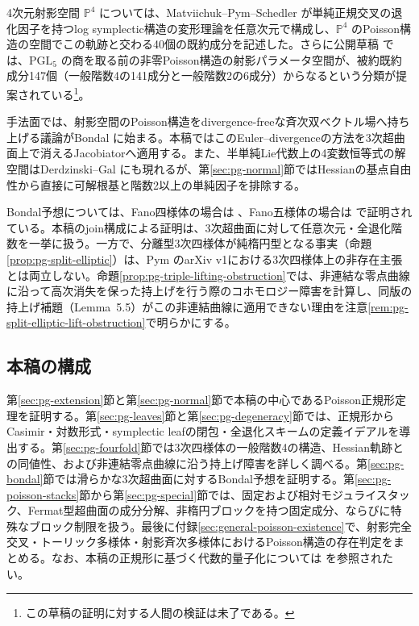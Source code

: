 4次元射影空間 $\mathbb P^4$ については、Matviichuk--Pym--Schedler \cite[Theorems~1.2--1.4]{MPSLocalTorelli} が単純正規交叉の退化因子を持つlog symplectic構造の変形理論を任意次元で構成し、$\mathbb P^4$ のPoisson構造の空間でこの軌跡と交わる40個の既約成分を記述した。さらに公開草稿 \cite{PoissonP4Draft} では、$\mathrm{PGL}_5$ の商を取る前の非零Poisson構造の射影パラメータ空間が、被約既約成分147個（一般階数4の141成分と一般階数2の6成分）からなるという分類が提案されている\footnote{この草稿の証明に対する人間の検証は未了である。}。

手法面では、射影空間のPoisson構造をdivergence-freeな斉次双ベクトル場へ持ち上げる議論がBondal \cite[\S4]{PBondal93} に始まる。本稿ではこのEuler--divergenceの方法を3次超曲面上で消えるJacobiatorへ適用する。また、半単純Lie代数上の4変数恒等式の解空間はDerdzinski--Gal \cite[(1.4), Theorem~B]{PDerdzinskiGal} にも現れるが、第\ref{sec:pg-normal}節ではHessianの基点自由性から直接に可解根基と階数2以上の単純因子を排除する。

Bondal予想については、Fano四様体の場合は \cite[Theorem~7.13]{BondalGualtieriPym}、Fano五様体の場合は \cite[Corollary~1.3]{BondalDruelPereiraPymTouzet} で証明されている。本稿のjoin構成による証明は、3次超曲面に対して任意次元・全退化階数を一挙に扱う。一方で、分離型3次四様体が純楕円型となる事実（命題\ref{prop:pg-split-elliptic}）は、Pym \cite[Theorem~1.3]{PPymElliptic} のarXiv v1における3次四様体上の非存在主張とは両立しない。命題\ref{prop:pg-triple-lifting-obstruction}では、非連結な零点曲線に沿って高次消失を保った持上げを行う際のコホモロジー障害を計算し、同版の持上げ補題（Lemma~5.5）がこの非連結曲線に適用できない理由を注意\ref{rem:pg-split-elliptic-lift-obstruction}で明らかにする。

\subsection*{本稿の構成}
第\ref{sec:pg-extension}節と第\ref{sec:pg-normal}節で本稿の中心であるPoisson正規形定理を証明する。第\ref{sec:pg-leaves}節と第\ref{sec:pg-degeneracy}節では、正規形からCasimir・対数形式・symplectic leafの閉包・全退化スキームの定義イデアルを導出する。第\ref{sec:pg-fourfold}節では3次四様体の一般階数4の構造、Hessian軌跡との同値性、および非連結零点曲線に沿う持上げ障害を詳しく調べる。第\ref{sec:pg-bondal}節では滑らかな3次超曲面に対するBondal予想を証明する。第\ref{sec:pg-poisson-stacks}節から第\ref{sec:pg-special}節では、固定および相対モジュライスタック、Fermat型超曲面の成分分解、非楕円ブロックを持つ固定成分、ならびに特殊なブロック制限を扱う。最後に付録\ref{sec:general-poisson-existence}で、射影完全交叉・トーリック多様体・射影斉次多様体におけるPoisson構造の存在判定をまとめる。なお、本稿の正規形に基づく代数的量子化については \cite{CubicQuantization} を参照されたい。

